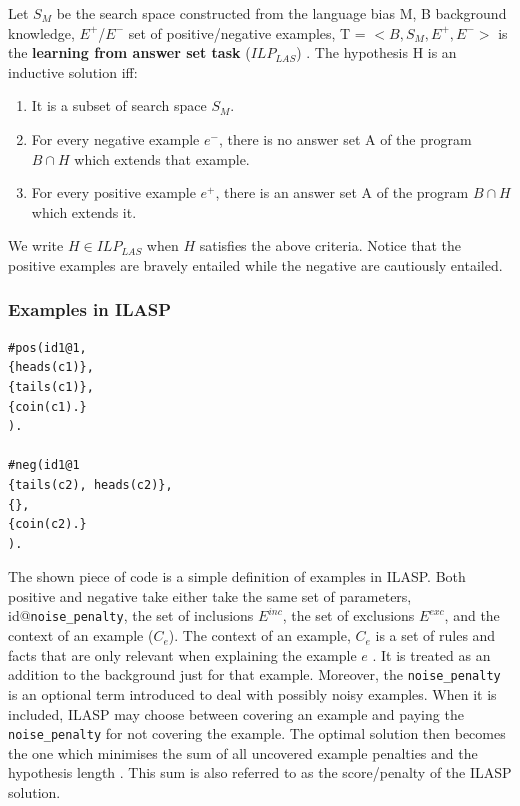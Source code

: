 Let $S_M$ be the search space constructed from the language bias M, B background knowledge, $E^+$/$E^-$ set of positive/negative examples, T = $<B, S_M, E^+, E^->$ is the \textbf{learning from answer set task} ($ILP_{LAS}$) \cite{RefWorks:RefID:47-law2014inductive}.
The hypothesis H is an inductive solution iff:
\begin{enumerate}
    \item It is a subset of search space $S_M$.
    \item For every negative example $e^-$, there is no answer set A of the program $B \cap H$ which extends that example.
    \item For every positive example $e^+$, there is an answer set A of the program $B \cap H$ which extends it.
\end{enumerate}

We write $H \in ILP_{LAS}$ when $H$ satisfies the above criteria.
Notice that the positive examples are bravely entailed while the negative are cautiously entailed.

\subsubsection{Examples in ILASP}
\label{examples-in-ilasp}

\begin{verbatim}
#pos(id1@1,
{heads(c1)},
{tails(c1)},
{coin(c1).}
).

#neg(id1@1
{tails(c2), heads(c2)},
{},
{coin(c2).}
).
\end{verbatim}

The shown piece of code is a simple definition of examples in ILASP. 
Both positive and negative take either take the same set of parameters, id@\verb+noise_penalty+, the set of inclusions $E^{inc}$, the set of exclusions $E^{exc}$, and the context of an example ($C_e$).
The context of an example, $C_e$ is a set of rules and facts that are only relevant when explaining the example $e$ \cite{RefWorks:RefID:56-broda2016iterative}.
It is treated as an addition to the background just for that example.
Moreover, the \verb+noise_penalty+ is an optional term introduced to deal with possibly noisy examples. 
When it is included, ILASP may choose between covering an example and paying the \verb+noise_penalty+ for not covering the example.
The optimal solution then becomes the one which minimises the sum of all uncovered example penalties and the hypothesis length \cite{RefWorks:RefID:83-law2018inductive}.
This sum is also referred to as the score/penalty of the ILASP solution.

